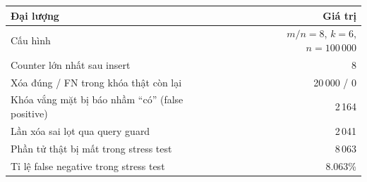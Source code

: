 \begin{tabular}{@{}lr@{}}
\toprule
Đại lượng & Giá trị\\
\midrule
Cấu hình & $m/n=8$, $k=6$, $n=100\,000$\\
Counter lớn nhất sau insert & 8\\
Xóa đúng / FN trong khóa thật còn lại & 20\,000 / 0\\
Khóa vắng mặt bị báo nhầm ``có'' (false positive) & 2\,164\\
Lần xóa sai lọt qua query guard & 2\,041\\
Phần tử thật bị mất trong stress test & 8\,063\\
Tỉ lệ false negative trong stress test & 8.063\%\\
\bottomrule
\end{tabular}
